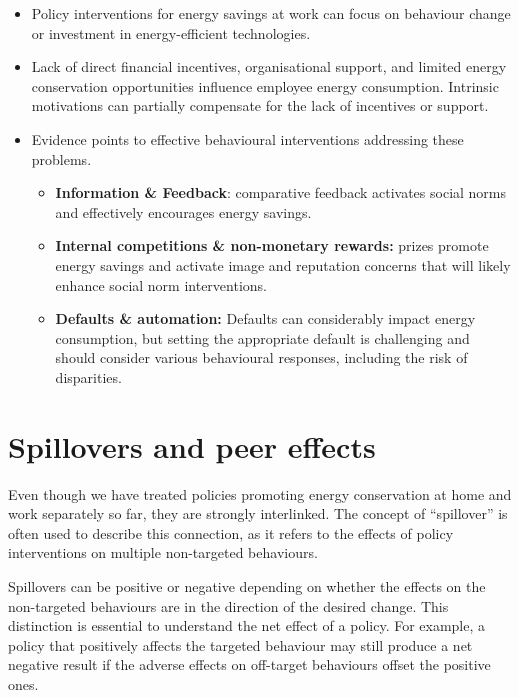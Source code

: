 \documentclass[
  11pt,
  captions=heading]{scrreport}
\begin{document}
\begin{itemize}
\item
  Policy interventions for energy savings at work can focus on behaviour
  change or investment in energy-efficient technologies.
\item
  Lack of direct financial incentives, organisational support, and
  limited energy conservation opportunities influence employee energy
  consumption. Intrinsic motivations can partially compensate for the
  lack of incentives or support.
\item
  Evidence points to effective behavioural interventions addressing
  these problems.

  \begin{itemize}
  \item
    \textbf{Information \& Feedback}: comparative feedback activates
    social norms and effectively encourages energy savings.
  \item
    \textbf{Internal competitions \& non-monetary rewards:} prizes
    promote energy savings and activate image and reputation concerns
    that will likely enhance social norm interventions.
  \item
    \textbf{Defaults \& automation:} Defaults can considerably impact
    energy consumption, but setting the appropriate default is
    challenging and should consider various behavioural responses,
    including the risk of disparities.
  \end{itemize}
\end{itemize}

\hypertarget{sec:spillovers}{%
\chapter{Spillovers and peer effects}\label{sec:spillovers}}

Even though we have treated policies promoting energy conservation at
home and work separately so far, they are strongly interlinked. The
concept of ``spillover'' is often used to describe this connection, as
it refers to the effects of policy interventions on multiple
non-targeted behaviours.

Spillovers can be positive or negative depending on whether the effects
on the non-targeted behaviours are in the direction of the desired
change. This distinction is essential to understand the net effect of a
policy. For example, a policy that positively affects the targeted
behaviour may still produce a net negative result if the adverse effects
on off-target behaviours offset the positive ones.
\end{document}
